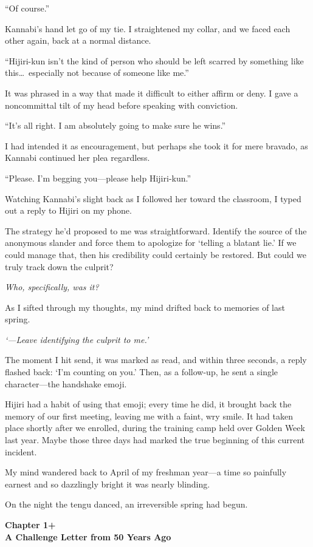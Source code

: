 \documentclass[
    a4paper,
    12pt,
    twoside,
    openany,
    UTF8,
    fontset=windows
]{ctexbook}
\begin{document}
``Of course.''

Kannabi's hand let go of my tie. I straightened my collar, and we faced each other again, back at a normal distance.

``Hijiri-kun isn't the kind of person who should be left scarred by something like this\dots\ especially not because of someone like me.''

It was phrased in a way that made it difficult to either affirm or deny. I gave a noncommittal tilt of my head before speaking with conviction.

``It's all right. I am absolutely going to make sure he wins.''

I had intended it as encouragement, but perhaps she took it for mere bravado, as Kannabi continued her plea regardless.

``Please. I'm begging you---please help Hijiri-kun.''

Watching Kannabi's slight back as I followed her toward the classroom, I typed out a reply to Hijiri on my phone.

The strategy he'd proposed to me was straightforward. Identify the source of the anonymous slander and force them to apologize for `telling a blatant lie.' If we could manage that, then his credibility could certainly be restored. But could we truly track down the culprit?

\textit{Who, specifically, was it?}

As I sifted through my thoughts, my mind drifted back to memories of last spring.

\textit{`---Leave identifying the culprit to me.'}

The moment I hit send, it was marked as read, and within three seconds, a reply flashed back: `I'm counting on you.' Then, as a follow-up, he sent a single character---the handshake emoji.

Hijiri had a habit of using that emoji; every time he did, it brought back the memory of our first meeting, leaving me with a faint, wry smile. It had taken place shortly after we enrolled, during the training camp held over Golden Week last year. Maybe those three days had marked the true beginning of this current incident.

My mind wandered back to April of my freshman year---a time so painfully earnest and so dazzlingly bright it was nearly blinding.

On the night the tengu danced, an irreversible spring had begun.


\clearpage
\thispagestyle{plain}
\begin{center}
    \large\bfseries
    Chapter 1+\\
    A Challenge Letter from 50 Years Ago
\end{center}
\label{sec:ch1p}
\vspace{1cm}
\end{document}
